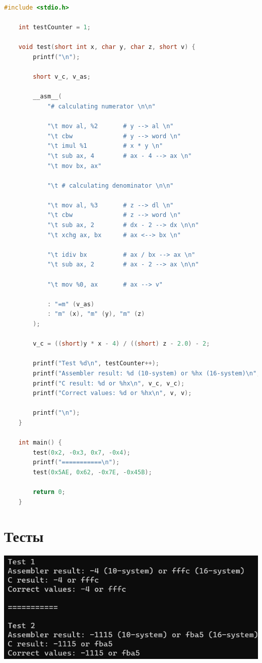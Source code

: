 \documentclass[12pt]{article}
\begin{document}
	\begin{lstlisting}[language=C]
	#include <stdio.h>
	
	int testCounter = 1;
	
	void test(short int x, char y, char z, short v) {
		printf("\n");
		
		short v_c, v_as;
		
		__asm__(
			"# calculating numerator \n\n"
			
			"\t mov al, %2       # y --> al \n"
			"\t cbw              # y --> word \n"
			"\t imul %1          # x * y \n"
			"\t sub ax, 4        # ax - 4 --> ax \n"
			"\t mov bx, ax"
			
			"\t # calculating denominator \n\n"
			
			"\t mov al, %3       # z --> dl \n"
			"\t cbw              # z --> word \n"
			"\t sub ax, 2        # dx - 2 --> dx \n\n"
			"\t xchg ax, bx      # ax <--> bx \n"
			
			"\t idiv bx          # ax / bx --> ax \n"
			"\t sub ax, 2        # ax - 2 --> ax \n\n"
			
			"\t mov %0, ax       # ax --> v"
			
			: "=m" (v_as)                
			: "m" (x), "m" (y), "m" (z)  
		);
		
		v_c = ((short)y * x - 4) / ((short) z - 2.0) - 2;
		
		printf("Test %d\n", testCounter++);
		printf("Assembler result: %d (10-system) or %hx (16-system)\n", v_as, v_as);
		printf("C result: %d or %hx\n", v_c, v_c);
		printf("Correct values: %d or %hx\n", v, v);
		
		printf("\n");
	}
	
	int main() {
		test(0x2, -0x3, 0x7, -0x4);
		printf("===========\n");
		test(0x5AE, 0x62, -0x7E, -0x45B);
		
		return 0;
	}
	\end{lstlisting}
	
	\newpage
	
	
	\section*{Тесты}
	
	\includegraphics[width=400pt]{tests.png}
	
\end{document}
